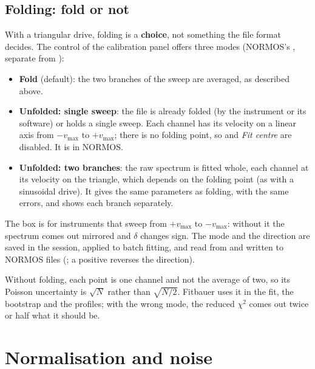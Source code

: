 \subsection{Folding: fold or not}
\label{sec:fold-mode}

With a triangular drive, folding is a \textbf{choice}, not something the file
format decides. The  control of the calibration panel offers three
modes (NORMOS's , separate from ):

\begin{itemize}[nosep]
  \item \textbf{Fold} (default): the two branches of the sweep are averaged, as
        described above.
  \item \textbf{Unfolded: single sweep}: the file is already folded (by the
        instrument or its software) or holds a single sweep. Each channel has its
        velocity on a linear axis from $-v_{\max}$ to $+v_{\max}$; there is no
        folding point, so  and \emph{Fit centre} are disabled. It is
         in NORMOS.
  \item \textbf{Unfolded: two branches}: the raw spectrum is fitted whole, each
        channel at its velocity on the triangle, which depends on the folding
        point (as with a sinusoidal drive). It gives the same parameters as
        folding, with the same errors, and shows each branch separately.
\end{itemize}

The  box is for instruments that sweep from $+v_{\max}$
to $-v_{\max}$: without it the spectrum comes out mirrored and $\delta$ changes
sign. The mode and the direction are saved in the session, applied to batch
fitting, and read from and written to NORMOS  files
(; a positive  reverses the direction).

\begin{nota}
Without folding, each point is one channel and not the average of two, so its
Poisson uncertainty is $\sqrt{N}$ rather than $\sqrt{N/2}$. Fitbauer uses it in
the fit, the bootstrap and the profiles; with the wrong mode, the reduced
$\chi^2$ comes out twice or half what it should be.
\end{nota}

\section{Normalisation and noise}

